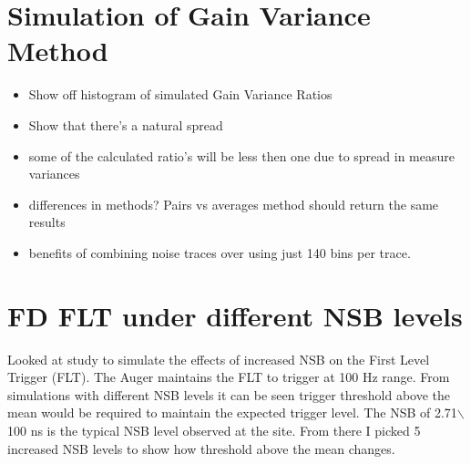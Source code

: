 \section{Simulation of Gain Variance Method}

\begin{itemize}
\item Show off histogram of simulated Gain Variance Ratios
\item Show that there's a natural spread
\item some of the calculated ratio's will be less then one due to spread in measure variances
\item differences in methods? Pairs vs averages method should return the same results
\item benefits of combining noise traces over using just 140 bins per trace.
\end{itemize}

\section{FD FLT under different NSB levels}

Looked at study to simulate the effects of increased NSB on the First Level Trigger (FLT). The Auger maintains the FLT to trigger at 100 Hz range. From simulations with different NSB levels it can be seen trigger threshold above the mean would be required to maintain the expected trigger level. The NSB of 2.71$\backslash$100 ns is the typical NSB level observed at the site. From there I picked 5 increased NSB levels to show how threshold above the mean changes. 


